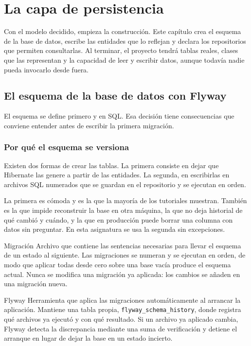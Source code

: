 \documentclass[11pt,a4paper,openany]{book}
\begin{document}
\chapter{La capa de persistencia}
\label{cap:persistencia}

Con el modelo decidido, empieza la construcción. Este capítulo crea el esquema de la base de datos, escribe las entidades que lo reflejan y declara los repositorios que permiten consultarlas. Al terminar, el proyecto tendrá tablas reales, clases que las representan y la capacidad de leer y escribir datos, aunque todavía nadie pueda invocarlo desde fuera.

\section{El esquema de la base de datos con Flyway}
\label{sec:flyway}

El esquema se define primero y en SQL. Esa decisión tiene consecuencias que conviene entender antes de escribir la primera migración.

\subsection{Por qué el esquema se versiona}
\label{sec:por-que-versionar}

Existen dos formas de crear las tablas. La primera consiste en dejar que Hibernate las genere a partir de las entidades. La segunda, en escribirlas en archivos SQL numerados que se guardan en el repositorio y se ejecutan en orden.

La primera es cómoda y es la que la mayoría de los tutoriales muestran. También es la que impide reconstruir la base en otra máquina, la que no deja historial de qué cambió y cuándo, y la que en producción puede borrar una columna con datos sin preguntar. En esta asignatura se usa la segunda sin excepciones.

\begin{cajadefinicion}{Migración}
	Archivo que contiene las sentencias necesarias para llevar el esquema de un estado al siguiente. Las migraciones se numeran y se ejecutan en orden, de modo que aplicar todas desde cero sobre una base vacía produce el esquema actual. Nunca se modifica una migración ya aplicada: los cambios se añaden en una migración nueva.
\end{cajadefinicion}

\begin{cajadefinicion}{Flyway}
	Herramienta que aplica las migraciones automáticamente al arrancar la aplicación. Mantiene una tabla propia, \texttt{flyway\_schema\_history}, donde registra qué archivos ya ejecutó y con qué resultado. Si un archivo ya aplicado cambia, Flyway detecta la discrepancia mediante una suma de verificación y detiene el arranque en lugar de dejar la base en un estado incierto.
\end{cajadefinicion}
\end{document}

